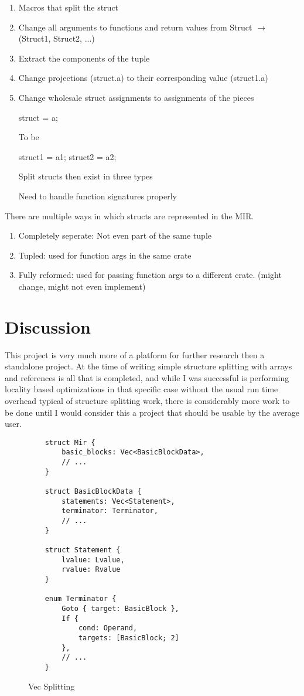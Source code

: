 \documentclass[12pt,final]{article}
\begin{document}
\begin{enumerate}
\item Macros that split the struct
\item Change all arguments to functions and return values from Struct $\rightarrow$ (Struct1, Struct2, ...)
\item Extract the components of the tuple 
\item Change projections (struct.a) to their corresponding value (struct1.a)
\item Change wholesale struct assignments to assignments of the pieces 

struct = a;

To be

struct1 = a1;
struct2 = a2;

Split structs then exist in three types

Need to handle function signatures properly

\end{enumerate}

There are multiple ways in which structs are represented in the MIR. 
\begin{enumerate}
\item Completely seperate: Not even part of the same tuple
\item Tupled: used for function args in the same crate
\item Fully reformed: used for passing function args to a different crate. (might change, might not even implement)
\end{enumerate}

\section{Discussion}
\label{sec:discuss}

This project is very much more of a platform for further research then a
standalone project. At the time of writing simple structure splitting
with arrays and references is all that is completed, and 
while I was successful is performing locality based
optimizations in that specific case without the usual run time overhead typical of structure splitting
work, there is considerably more work to be done until I would consider this
a project that should be usable by the average user.

\begin{figure*}
 \begin{verbatim}
    struct Mir {
        basic_blocks: Vec<BasicBlockData>,
        // ...
    }

    struct BasicBlockData {
        statements: Vec<Statement>,
        terminator: Terminator,
        // ...
    }

    struct Statement {
        lvalue: Lvalue,
        rvalue: Rvalue
    }

    enum Terminator {
        Goto { target: BasicBlock },
        If {
            cond: Operand,
            targets: [BasicBlock; 2]
        },
        // ...
    }
\end{verbatim} 
  \caption{Vec Splitting}
  \label{fig:vec-split}
\end{figure*}
\end{document}
